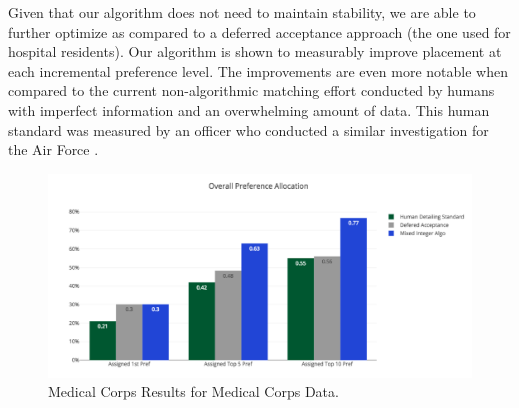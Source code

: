 Given that our algorithm does not need to maintain stability, we are able to further optimize as compared to a deferred acceptance approach (the one used for hospital residents).  Our algorithm is shown to measurably improve placement at each incremental preference level. The improvements are even more notable when compared to the current non-algorithmic matching effort conducted by humans with imperfect information and an overwhelming amount of data. This human standard was measured by an officer who conducted a similar investigation for the Air Force \citep{2018_Lepird}. 

\begin{figure}
    \FIGURE
    {\includegraphics[scale=0.75]{Sections/figures/med_bar.png}}
    {Medical Corps}
    {Results for Medical Corps Data.}
\end{figure}

